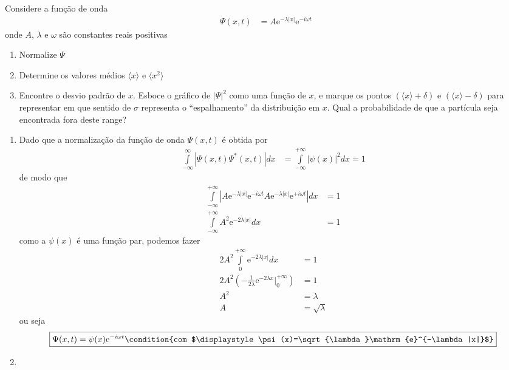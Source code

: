 \begin{prob}
	Considere a função de onda
	\begin{align}
		\Psi(x,t)&=A \mathrm{e}^{-\lambda |x|} \mathrm{e}^{-i\omega t}
	\end{align}
	onde $A$, $\lambda$ e $\omega$ são constantes reais positivas
	\begin{enumerate}[label=\alph *)]
		\item Normalize $\Psi$
		\item Determine os valores médios $\langle x \rangle$ e $\langle x^{2} \rangle$
		\item Encontre o desvio padrão de $x$. Esboce o gráfico de $|\Psi|^2$ como uma função de $x$, e marque os pontos $\left(\langle x \rangle + \delta \right)$ e $\left(\langle x \rangle - \delta\right)$ para representar em que sentido de $\sigma$ representa o ``espalhamento'' da distribuição em $x$. Qual a probabilidade de que a partícula seja encontrada fora deste range?
	\end{enumerate}

	\begin{sol}
		\begin{enumerate}[label=\alph *)]
			\item Dado que a normalização da função de onda $\Psi (x,t)$ é obtida por  
				\begin{align}
					\int\limits_{-\infty}^{\infty}|\Psi (x,t)\Psi^{*} (x,t)|dx &= \int\limits_{-\infty}^{+\infty}|\psi (x)|^{2}dx = 1
				\end{align}
				de modo que
				\begin{align}
					\int\limits_{-\infty}^{+\infty}|A \mathrm{e}^{-\lambda |x|} \mathrm{e}^{-i \omega t}A \mathrm{e}^{-\lambda |x|} \mathrm{e}^{+i \omega t}|dx &=1 \nonumber\\
					\int\limits_{-\infty}^{+\infty}A^{2} \mathrm{e}^{-2 \lambda |x|}dx &= 1
				\end{align}
				como a $\psi(x)$ é uma função par, podemos fazer
				\begin{align}
					2A^{2}	\int\limits_{0}^{+\infty} \mathrm{e}^{-2 \lambda |x|}dx &= 1\nonumber \\
					2A^{2}\left(-\frac{1}{2 \lambda} \mathrm{e}^{-2 \lambda x}\bigg|_{0}^{+\infty}\right) &= 1\nonumber \\
					A^{2} &= \lambda \nonumber \\
					A &= \sqrt{\lambda}
				\end{align}
				ou seja
				\begin{dmath*}
					\boxed{
						\Psi(x,t)=\psi(x)\mathrm{e}^{-i \omega t}\condition{com $\displaystyle \psi(x)=\sqrt{\lambda}\mathrm{e}^{-\lambda |x|}$}
					}
				\end{dmath*}
			\item  
		\end{enumerate} 	
	\end{sol}
\end{prob}

